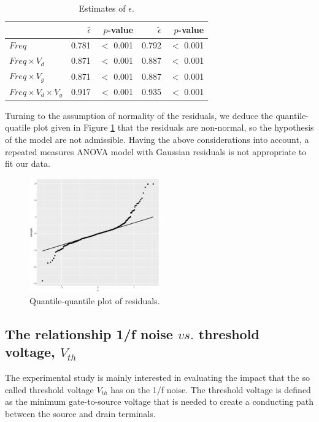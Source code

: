 \documentclass[sn-mathphys]{sn-jnl}%
\theoremstyle{thmstyleone}%
\theoremstyle{thmstyletwo}%
\theoremstyle{thmstylethree}%
\begin{document}
\begin{table}[!t]
	\centering
	\begin{tabular}{lrrrr}
		\hline
		& $\hat{\epsilon}$ & $p$-value &$\tilde{\epsilon}$&$p$-value \\ 
		\hline
		$ Freq$ & 0.781&$<$ 0.001  & 0.792 &$<$ 0.001 \\ 
		$Freq \times V_d$ & 0.871&$<$ 0.001  & 0.887&$<$ 0.001  \\ 
		$Freq \times V_g$ & 0.871&$<$ 0.001  & 0.887&$<$ 0.001  \\ 
		$Freq \times V_d \times V_g$ & 0.917&$<$ 0.001  & 0.935&$<$ 0.001  \\ 
		\hline
	\end{tabular}
	\caption{Estimates of $\epsilon$.} 
	\label{tab:epsilontable}
\end{table}

Turning to the assumption of normality of the residuals, we deduce the quantile-quatile plot given in Figure \ref{fig:normalidad} that the residuals are non-normal, so the hypothesis of the model are not admissible. Having the above considerations into account, a repeated measures ANOVA model with Gaussian residuals is not appropriate to fit our data. 


\begin{figure}[ht]
	\centerline{
		\includegraphics[width=0.5\textwidth]{Fig4_residuos.eps}}
	\caption{Quantile-quantile plot of residuals.}
	\label{fig:normalidad}
\end{figure}

\subsection{The relationship 1/f noise $vs.$ threshold voltage, $V_{th}$} \label{sec:noiseVSvth}
The experimental study is mainly interested in evaluating the impact that the so called threshold voltage $V_{th}$ has on the 1/f noise. The threshold voltage is defined as the minimum gate-to-source voltage that is needed to create a conducting path between the source and drain terminals.\
\end{document}
